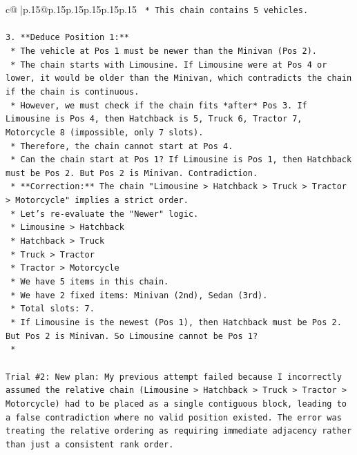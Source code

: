\documentclass{article}
\begin{document}
{\begin{supertabular}{c@{$\;$}|p{.15\linewidth}@{}p{.15\linewidth}p{.15\linewidth}p{.15\linewidth}p{.15\linewidth}p{.15\linewidth}}
{{{\texttt{    *   This chain contains 5 vehicles.} \\
\\ 
\texttt{3.  **Deduce Position 1:**} \\
\texttt{    *   The vehicle at Pos 1 must be newer than the Minivan (Pos 2).} \\
\texttt{    *   The chain starts with Limousine. If Limousine were at Pos 4 or lower, it would be older than the Minivan, which contradicts the chain if the chain is continuous.} \\
\texttt{    *   However, we must check if the chain fits *after* Pos 3. If Limousine is Pos 4, then Hatchback is 5, Truck 6, Tractor 7, Motorcycle 8 (impossible, only 7 slots).} \\
\texttt{    *   Therefore, the chain cannot start at Pos 4.} \\
\texttt{    *   Can the chain start at Pos 1? If Limousine is Pos 1, then Hatchback must be Pos 2. But Pos 2 is Minivan. Contradiction.} \\
\texttt{    *   **Correction:** The chain "Limousine > Hatchback > Truck > Tractor > Motorcycle" implies a strict order.} \\
\texttt{    *   Let's re{-}evaluate the "Newer" logic.} \\
\texttt{        *   Limousine > Hatchback} \\
\texttt{        *   Hatchback > Truck} \\
\texttt{        *   Truck > Tractor} \\
\texttt{        *   Tractor > Motorcycle} \\
\texttt{    *   We have 5 items in this chain.} \\
\texttt{    *   We have 2 fixed items: Minivan (2nd), Sedan (3rd).} \\
\texttt{    *   Total slots: 7.} \\
\texttt{    *   If Limousine is the newest (Pos 1), then Hatchback must be Pos 2. But Pos 2 is Minivan. So Limousine cannot be Pos 1?} \\
\texttt{    *} \\
\\ 
\texttt{Trial \#2: New plan: My previous attempt failed because I incorrectly assumed the relative chain (Limousine > Hatchback > Truck > Tractor > Motorcycle) had to be placed as a single contiguous block, leading to a false contradiction where no valid position existed. The error was treating the relative ordering as requiring immediate adjacency rather than just a consistent rank order.} \\
}}}
\end{supertabular}}
\end{document}
